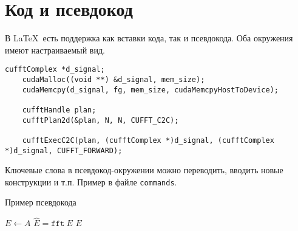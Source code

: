 
\section{Код и псевдокод}
В \LaTeX~есть поддержка как вставки кода, так и псевдокода. Оба окружения имеют настраиваемый вид.

\begin{lstlisting}[caption={Пример вызова БПФ в библиотеке \texttt{CuFFT}}]
    cufftComplex *d_signal;
    cudaMalloc((void **) &d_signal, mem_size);
    cudaMemcpy(d_signal, fg, mem_size, cudaMemcpyHostToDevice);

    cufftHandle plan;
    cufftPlan2d(&plan, N, N, CUFFT_C2C);

    cufftExecC2C(plan, (cufftComplex *)d_signal, (cufftComplex *)d_signal, CUFFT_FORWARD);
\end{lstlisting}

Ключевые слова в псевдокод-окружении можно переводить, вводить новые конструкции и т.п. Пример в файле \texttt{commands}.
\begin{algorithm}[H]
    \caption{Пример псевдокода}
    \begin{algorithmic}[1]
        \State $E \gets A$
        \State $\hat{E} = \texttt{fft}~E$
        \EndFor
        \State \Return $E$
        \EndProcedure
    \end{algorithmic}
\end{algorithm}
